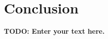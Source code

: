 \documentclass[draft,final]{vutinfth} %
\newcommand{\todo}[1]{{\color{red}\textbf{TODO: {#1}}}} %
\begin{document}
\section{Conclusion}
\label{dicussion-chapter-conclusion}

\todo{Enter your text here.}

\backmatter

\listoffigures %

\listoftables %

\listofalgorithms
{}

\printindex

\printglossaries



\end{document}

